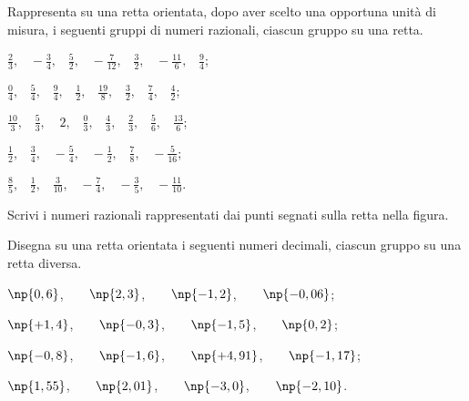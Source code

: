 \begin{esercizio}
 \label{ese:3.26}
Rappresenta su una retta orientata, dopo aver scelto una opportuna unità di misura,
i seguenti gruppi di numeri razionali, ciascun gruppo su una retta.
 \begin{enumeratea}
\spazielenx
 \item $\displaystyle{\frac{2}{3}\text{,}\quad-\frac{3}{4}\text{,}\quad\frac{5}{2}\text{,}\quad-\frac{7}{12}\text{,}\quad\frac{3}{2}\text{,}\quad%
-\frac{11}{6}\text{,}\quad\frac{9}{4}}$;
 \item $\displaystyle{\frac{0}{4}\text{,}\quad\frac{5}{4}\text{,}\quad\frac{9}{4}\text{,}\quad\frac{1}{2}\text{,}\quad\frac{19}{8}\text{,}\quad\frac{3}{2}%
\text{,}\quad\frac{7}{4}\text{,}\quad\frac{4}{2}}$;
 \item $\displaystyle{\frac{10}{3}\text{,}\quad\frac{5}{3}\text{,}\quad~2\text{,}\quad\frac{0}{3}\text{,}\quad\frac{4}{3}\text{,}\quad\frac{2}{3}%
\text{,}\quad\frac{5}{6}\text{,}\quad\frac{13}{6}}$;
 \item $\displaystyle{\frac{1}{2}\text{,}\quad\frac{3}{4}\text{,}\quad-\frac{5}{4}\text{,}\quad-\frac{1}{2}\text{,}\quad\frac{7}{8}\text{,}%
\quad-\frac{5}{16}}$;
\item $\displaystyle{\frac{8}{5}\text{,}\quad\frac{1}{2}\text{,}\quad\frac{3}{10}\text{,}\quad-\frac{7}{4}\text{,}\quad-\frac{3}{5}%
\text{,}\quad-\frac{11}{10}}$.
 \end{enumeratea}
\end{esercizio}

\begin{esercizio}
 \label{ese:3.27}
 Scrivi i numeri razionali rappresentati dai punti segnati sulla retta nella figura.
\begin{center}

\end{center}

\end{esercizio}

\begin{esercizio}
 \label{ese:3.28}
Disegna su una retta orientata i seguenti numeri decimali, ciascun gruppo su una retta diversa.
\begin{enumeratea}
 \item $\np{0,6}$,$\qquad\np{2,3}$,$\qquad\np{-1,2}$,$\qquad\np{-0,06}$;
 \item $\np{+1,4}$,$\qquad\np{-0,3}$,$\qquad\np{-1,5}$,$\qquad\np{0,2}$;
 \item $\np{-0,8}$,$\qquad\np{-1,6}$,$\qquad\np{+4,91}$,$\qquad\np{-1,17}$;
 \item $\np{1,55}$,$\qquad\np{2,01}$,$\qquad\np{-3,0}$,$\qquad\np{-2,10}$.
\end{enumeratea}
\end{esercizio}

